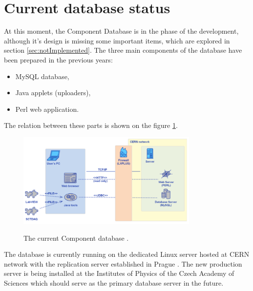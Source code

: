 \section{Current database status}
\label{sec:currentDatabaseStatus}

\par At this moment, the Component Database is in the phase of the development, although it's design is missing some important items, which are explored in section \ref{sec:notImplemented}. The three main components of the database have been prepared in the previous years:

\begin{itemize}
	\item MySQL database,
	\item Java applets (uploaders),
	\item Perl web application.
\end{itemize}


\par The relation between these parts is shown on the figure \ref{fig:currentDatabaseStatus}.

	
\begin{figure}[!ht]
	\centering
	\includegraphics[width=0.8\textwidth]{img/itkCurrentStatus.jpg}\\	
	\caption{The current Component database \cite[slide 4]{presCurrentDatabaseStatus}.}
	\label{fig:currentDatabaseStatus}
\end{figure}


\par The database is currently running on the dedicated Linux server hosted at CERN network with the replication server established in Prague \cite[slide 5]{presCurrentDatabaseStatus}. The new production server is being installed at the Institutes of Physics of the Czech Academy of Sciences \cite[slide 10]{presCurrentDatabaseStatus} which should serve as the primary database server in the future.


